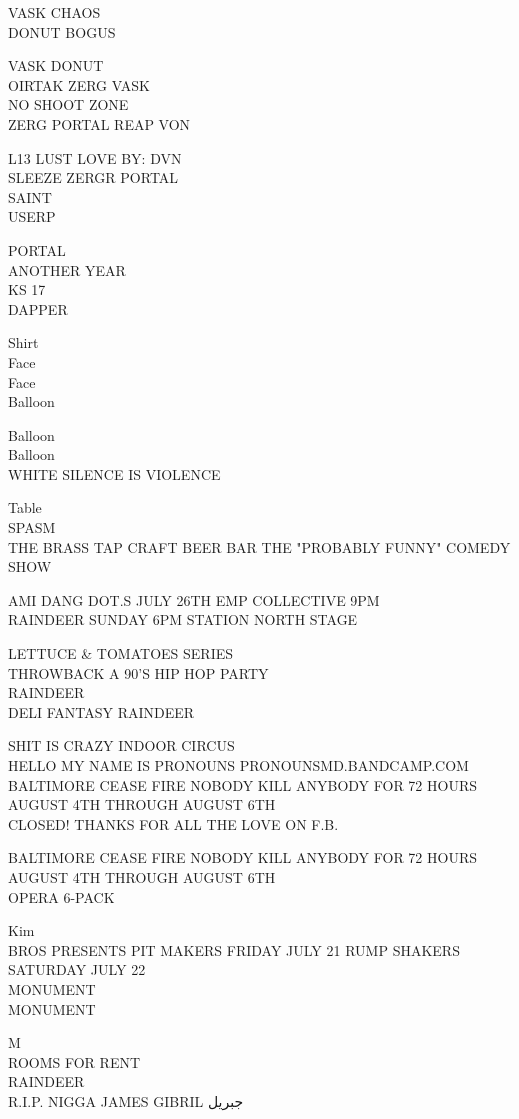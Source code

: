\documentclass[10pt,letterpaper]{article}
\begin{document}
VASK CHAOS\\
DONUT BOGUS

VASK DONUT\\
OIRTAK ZERG VASK\\
NO SHOOT ZONE\\
ZERG PORTAL REAP VON

L13 LUST LOVE BY: DVN\\
SLEEZE ZERGR PORTAL\\
SAINT\\
USERP

PORTAL\\
ANOTHER YEAR\\
KS 17\\
DAPPER

Shirt\\
Face\\
Face\\
Balloon

Balloon\\
Balloon\\
WHITE SILENCE IS VIOLENCE

Table\\
SPASM\\
THE BRASS TAP CRAFT BEER BAR THE "PROBABLY FUNNY" COMEDY SHOW

AMI DANG DOT.S JULY 26TH EMP COLLECTIVE 9PM\\
RAINDEER SUNDAY 6PM STATION NORTH STAGE

LETTUCE \& TOMATOES SERIES\\
THROWBACK A 90'S HIP HOP PARTY\\
RAINDEER\\
DELI FANTASY RAINDEER

SHIT IS CRAZY INDOOR CIRCUS\\
HELLO MY NAME IS PRONOUNS PRONOUNSMD.BANDCAMP.COM\\
BALTIMORE CEASE FIRE NOBODY KILL ANYBODY FOR 72 HOURS AUGUST 4TH THROUGH AUGUST 6TH\\
CLOSED! THANKS FOR ALL THE LOVE ON F.B.

BALTIMORE CEASE FIRE NOBODY KILL ANYBODY FOR 72 HOURS AUGUST 4TH THROUGH AUGUST 6TH\\
OPERA 6{-}PACK

Kim\\
BROS PRESENTS PIT MAKERS FRIDAY JULY 21 RUMP SHAKERS SATURDAY JULY 22\\
MONUMENT\\
MONUMENT

M\\
ROOMS FOR RENT\\
RAINDEER\\
R.I.P. NIGGA JAMES GIBRIL جبريل
\end{document}
